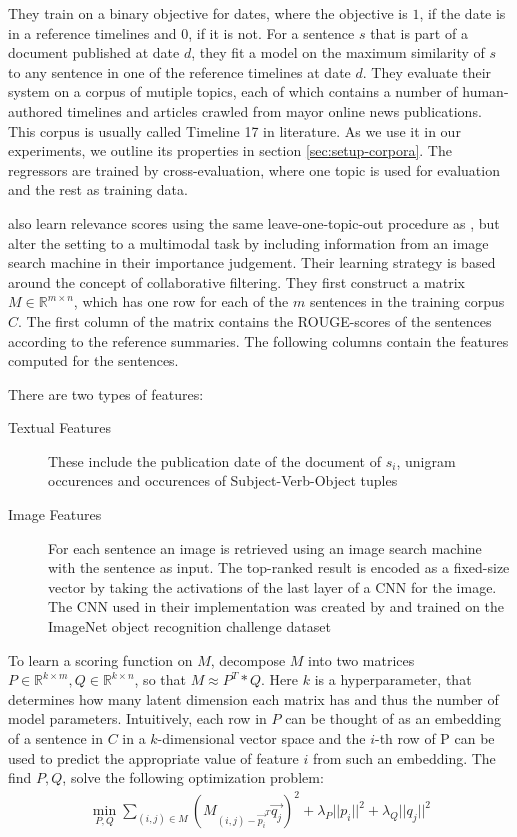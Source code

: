 \documentclass[a4paper,BCOR=10mm]{report}
\numberwithin{lemma}{chapter}
\numberwithin{definition}{chapter}
\begin{document}
They train on a binary objective for dates, where the objective is $1$, if the date is in a reference timelines and $0$, if it is not.
For a sentence $s$ that is part of a document published at date $d$, they fit a model on the maximum similarity of $s$ to any sentence in one of the reference timelines at date $d$.
They evaluate their system on a corpus of mutiple topics, each of which contains a number of human-authored timelines and articles crawled from mayor online news publications. This corpus is usually called Timeline 17 in literature. As we use it in our experiments, we outline its properties in section \ref{sec:setup-corpora}. The regressors are trained by cross-evaluation, where one topic is used for evaluation and the rest as training data.

\citet{multimodal} also learn relevance scores using the same leave-one-topic-out procedure as \citet{tran-relevant}, but alter the setting to a multimodal task by including information from an image search machine in their importance judgement.
Their learning strategy is based around the concept of collaborative filtering.
They first construct a matrix $M \in \mathbb{R}^{m \times n}$, which has one row for each of the $m$ sentences in the training corpus $C$. The first column of the matrix contains the ROUGE-scores of the sentences according to the reference summaries. The following columns contain the features computed for the sentences.

There are two types of features:

\begin{description}
\item[Textual Features]{These include the publication date of the document of $s_i$, unigram occurences and occurences of Subject-Verb-Object tuples}
\item[Image Features]{For each sentence an image is retrieved using an image search machine with the sentence as input. The top-ranked result is encoded as a fixed-size vector by taking the activations of the last layer of a CNN for the image. The CNN used in their implementation was created by \citet{Simonyan+Zisserman} and trained on the ImageNet \citep{ImageNet} object recognition challenge dataset}
\end{description}

To learn a scoring function on $M$, \citet{multimodal} decompose $M$ into two matrices $P \in \mathbb{R}^{k \times m}, Q \in \mathbb{R}^{k \times n}$, so that $M \approx P^T * Q$. Here $k$ is a hyperparameter, that determines how many latent dimension each matrix has and thus the number of model parameters. Intuitively, each row in $P$ can be thought of as an embedding of a sentence in $C$ in a $k$-dimensional vector space and the $i$-th row of P can be used to predict the appropriate value of feature $i$ from such an embedding.
The find $P, Q$, \citeauthor{multimodal} solve the following optimization problem:
\begin{align}
\min_{P, Q} \sum_{(i,j) \in M} (M_{(i,j) - \vec{p_i}^T}\vec{q_j})^2 + \lambda_P ||p_i|| ^ 2 + \lambda_Q ||q_j|| ^ 2 \label{multimodal-objective}
\end{align}
\end{document}
